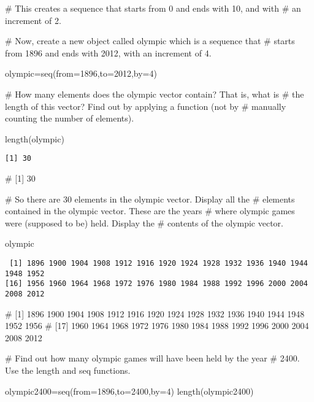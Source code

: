 \documentclass[
  letterpaper,
  DIV=11,
  numbers=noendperiod]{scrartcl}
\newenvironment{Shaded}{\begin{snugshade}}{\end{snugshade}}
\newcommand{\AttributeTok}[1]{\textcolor[rgb]{0.40,0.45,0.13}{#1}}
\newcommand{\CommentTok}[1]{\textcolor[rgb]{0.37,0.37,0.37}{#1}}
\newcommand{\DecValTok}[1]{\textcolor[rgb]{0.68,0.00,0.00}{#1}}
\newcommand{\FunctionTok}[1]{\textcolor[rgb]{0.28,0.35,0.67}{#1}}
\newcommand{\NormalTok}[1]{\textcolor[rgb]{0.00,0.23,0.31}{#1}}
\newcommand{\OtherTok}[1]{\textcolor[rgb]{0.00,0.23,0.31}{#1}}
\begin{document}
\begin{Shaded}
\begin{Highlighting}[]
\CommentTok{\# This creates a sequence that starts from 0 and ends with 10, and with }
\CommentTok{\# an increment of 2. }




\CommentTok{\# Now, create a new object called olympic which is a sequence that }
\CommentTok{\# starts from 1896 and ends with 2012, with an increment of 4. }


\NormalTok{olympic}\OtherTok{=}\FunctionTok{seq}\NormalTok{(}\AttributeTok{from=}\DecValTok{1896}\NormalTok{,}\AttributeTok{to=}\DecValTok{2012}\NormalTok{,}\AttributeTok{by=}\DecValTok{4}\NormalTok{)}


\CommentTok{\# How many elements does the olympic vector contain? That is, what is}
\CommentTok{\# the length of this vector? Find out by applying a function (not by}
\CommentTok{\# manually counting the number of elements). }


\FunctionTok{length}\NormalTok{(olympic)}
\end{Highlighting}
\end{Shaded}

\begin{verbatim}
[1] 30
\end{verbatim}

\begin{Shaded}
\begin{Highlighting}[]
\CommentTok{\# [1] 30}



\CommentTok{\# So there are 30 elements in the olympic vector. Display all the }
\CommentTok{\# elements contained in the olympic vector. These are the years}
\CommentTok{\# where olympic games were (supposed to be) held. Display the }
\CommentTok{\# contents of the olympic vector. }


\NormalTok{olympic}
\end{Highlighting}
\end{Shaded}

\begin{verbatim}
 [1] 1896 1900 1904 1908 1912 1916 1920 1924 1928 1932 1936 1940 1944 1948 1952
[16] 1956 1960 1964 1968 1972 1976 1980 1984 1988 1992 1996 2000 2004 2008 2012
\end{verbatim}

\begin{Shaded}
\begin{Highlighting}[]
\CommentTok{\# [1] 1896 1900 1904 1908 1912 1916 1920 1924 1928 1932 1936 1940 1944 1948 1952 1956}
\CommentTok{\# [17] 1960 1964 1968 1972 1976 1980 1984 1988 1992 1996 2000 2004 2008 2012}

\CommentTok{\# Find out how many olympic games will have been held by the year}
\CommentTok{\# 2400. Use the length and seq functions. }


\NormalTok{olympic2400}\OtherTok{=}\FunctionTok{seq}\NormalTok{(}\AttributeTok{from=}\DecValTok{1896}\NormalTok{,}\AttributeTok{to=}\DecValTok{2400}\NormalTok{,}\AttributeTok{by=}\DecValTok{4}\NormalTok{)}
\FunctionTok{length}\NormalTok{(olympic2400)}
\end{Highlighting}
\end{Shaded}
\end{document}
